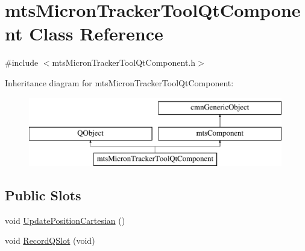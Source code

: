 \hypertarget{classmts_micron_tracker_tool_qt_component}{\section{mts\-Micron\-Tracker\-Tool\-Qt\-Component Class Reference}
\label{classmts_micron_tracker_tool_qt_component}
}


{\ttfamily \#include $<$mts\-Micron\-Tracker\-Tool\-Qt\-Component.\-h$>$}

Inheritance diagram for mts\-Micron\-Tracker\-Tool\-Qt\-Component\-:\begin{figure}[H]
\begin{center}
\leavevmode
\includegraphics[height=3.000000cm]{db/dd8/classmts_micron_tracker_tool_qt_component}
\end{center}
\end{figure}
\subsection*{Public Slots}
\begin{DoxyCompactItemize}
\item 
void \hyperlink{classmts_micron_tracker_tool_qt_component_af8a039d539c05273dea49d4153223da9}{Update\-Position\-Cartesian} ()
\item 
void \hyperlink{classmts_micron_tracker_tool_qt_component_a8fa86b242a7ee1ceec2b00e5b84279d0}{Record\-Q\-Slot} (void)
\end{DoxyCompactItemize}
